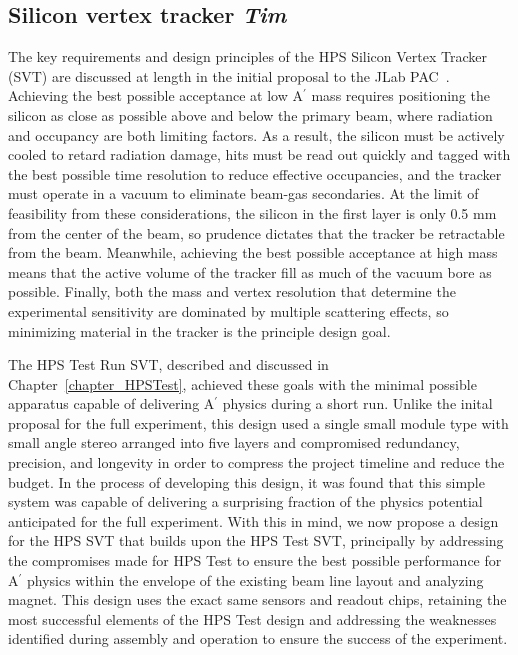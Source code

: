 \subsection{Silicon vertex tracker {\it Tim}}
\label{sec:svt}

The key requirements and design principles of the HPS Silicon Vertex Tracker (SVT) are discussed at length in the initial proposal to the JLab PAC~\cite{HPS_PAC37proposal}.  Achieving the best possible acceptance at low A$^\prime$ mass requires positioning the silicon as close as possible above and below the primary beam, where radiation and occupancy are both limiting factors.  As a result, the silicon must be actively cooled to retard radiation damage, hits must be read out quickly and tagged with the best possible time resolution to reduce effective occupancies, and the tracker must operate in a vacuum to eliminate beam-gas secondaries.  At the limit of feasibility from these considerations, the silicon in the first layer is only 0.5 mm from the center of the beam, so prudence dictates that the tracker be retractable from the beam. Meanwhile, achieving the best possible acceptance at high mass means that the active volume of the tracker fill as much of the vacuum bore as possible.  Finally, both the mass and vertex resolution that determine the experimental sensitivity are dominated by multiple scattering effects, so minimizing material in the tracker is the principle design goal.

The HPS Test Run SVT, described and discussed in Chapter~\ref{chapter_HPSTest}, achieved these goals with the minimal possible apparatus capable of delivering A$^\prime$ physics during a short run. Unlike the inital proposal for the full experiment, this design used a single small module type with small angle stereo arranged into five layers and compromised redundancy, precision, and longevity in order to compress the project timeline and reduce the budget. In the process of developing this design, it was found that this simple system was capable of delivering a surprising fraction of the physics potential anticipated for the full experiment.  With this in mind, we now propose a design for the HPS SVT that builds upon the HPS Test  SVT, principally by addressing the compromises made for HPS Test to ensure the best possible performance for A$^\prime$ physics within the envelope of the existing beam line layout and analyzing magnet.  This design uses the exact same sensors and readout chips, retaining the most successful elements of the HPS Test design and addressing the weaknesses identified during assembly and operation to ensure the success of the experiment.


